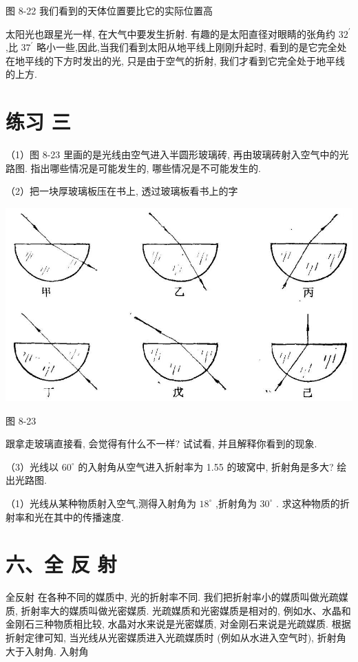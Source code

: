 \documentclass[10pt]{article}
\begin{document}
图 8-22 我们看到的天体位置要比它的实际位置高

太阳光也跟星光一样, 在大气中要发生折射. 有趣的是太阳直径对眼睛的张角约 \({32}^{\prime }\) ,比 \({37}^{\prime }\) 略小一些,因此,当我们看到太阳从地平线上刚刚升起时, 看到的是它完全处在地平线的下方时发出的光, 只是由于空气的折射, 我们才看到它完全处于地平线的上方.

\section*{练习 三}

（1）图 8-23 里画的是光线由空气进入半圆形玻璃砖, 再由玻璃砖射入空气中的光路图. 指出哪些情况是可能发生的, 哪些情况是不可能发生的.

（2）把一块厚玻璃板压在书上, 透过玻璃板看书上的字

\begin{center}
\includegraphics[max width=1.0\textwidth]{images/01913056-1f15-74d8-9184-9aab52c9d66b_263_500225.jpg}
\end{center}

图 8-23

跟拿走玻璃直接看, 会觉得有什么不一样? 试试看, 并且解释你看到的现象.

（3）光线以 \({60}^{ \circ }\) 的入射角从空气进入折射率为 1.55 的玻窝中, 折射角是多大? 绘出光路图.

（1）光线从某种物质射入空气,测得入射角为 \({18}^{ \circ }\) ,折射角为 \({30}^{ \circ }\) . 求这种物质的折射率和光在其中的传播速度.

\section*{六、全 反 射}

全反射 在各种不同的媒质中, 光的折射率不同. 我们把折射率小的媒质叫做光疏媒质, 折射率大的媒质叫做光密媒质. 光疏媒质和光密媒质是相对的, 例如水、水晶和金刚石三种物质相比较, 水晶对水来说是光密媒质, 对金刚石来说是光疏媒质. 根据折射定律可知, 当光线从光密媒质进入光疏媒质时 (例如从水进入空气时), 折射角大于入射角. 入射角
\end{document}
